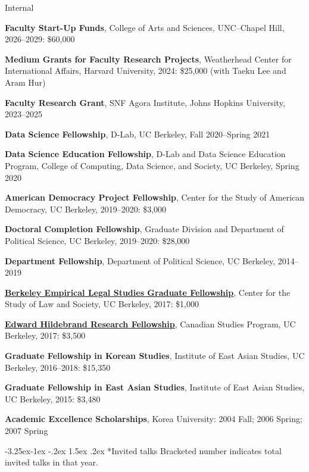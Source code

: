 \documentclass[10pt, letterpaper]{article}
\makeatletter
\renewcommand\subsection{\@startsection{subsection}{2}{\z@}%
  {-3.25ex\@plus -1ex \@minus -.2ex}%
  {1.5ex \@plus .2ex}%
  {\normalfont\large\bfseries\color{cvnavy}}}
\renewenvironment{itemize}{
\begin{list}{}{
        \setlength{\leftmargin}{1.5em}
        \setlength{\itemsep}{0.10em}
        \setlength{\parskip}{0pt}
        \setlength{\parsep}{0.10em}
    }
}{
\end{list}
}
\makeatother
\begin{document}
\begin{itemize}
\item Internal 
\begin{etaremune}
\item \textbf{Faculty Start-Up Funds}, College of Arts and Sciences, UNC--Chapel Hill, 2026--2029: \$60,000
\item \textbf{Medium Grants for Faculty Research Projects}, Weatherhead Center for International Affairs, Harvard University, 2024: \$25,000 (with Taeku Lee and Aram Hur)
\item \textbf{Faculty Research Grant}, SNF Agora Institute, Johns Hopkins University, 2023--2025
\item \textbf{Data Science Fellowship}, D-Lab, UC Berkeley, Fall 2020--Spring 2021 
\item \textbf{Data Science Education Fellowship}, D-Lab and Data Science Education Program, College of Computing, Data Science, and Society, UC Berkeley, Spring 2020 
\item \textbf{American Democracy Project Fellowship}, Center for the Study of American Democracy, UC Berkeley, 2019--2020: \$3,000
\item \textbf{Doctoral Completion Fellowship}, Graduate Division and Department of Political Science, UC Berkeley, 2019--2020: \$28,000
\item \textbf{Department Fellowship}, Department of Political Science, UC Berkeley, 2014--2019
\item \textbf{\href{https://www.law.berkeley.edu/research/center-for-the-study-of-law-society/bels-fellows/}{Berkeley Empirical Legal Studies Graduate Fellowship}}, Center for the Study of Law and Society, UC Berkeley, 2017: \$1,000
\item \textbf{\href{https://canada.berkeley.edu/edward-hildebrand-research-fellowship}{Edward Hildebrand Research Fellowship}}, Canadian Studies Program, UC Berkeley, 2017: \$3,500
\item \textbf{Graduate Fellowship in Korean Studies}, Institute of East Asian Studies, UC Berkeley, 2016--2018: \$15,350
\item \textbf{Graduate Fellowship in East Asian Studies}, Institute of East Asian Studies, UC Berkeley, 2015: \$3,480
\item \textbf{Academic Excellence Scholarships}, Korea University: 2004 Fall; 2006 Spring; 2007 Spring
\end{etaremune}
\end{itemize}

\subsection*{Invited talks}
{\small Bracketed number indicates total invited talks in that year.}
\end{document}
